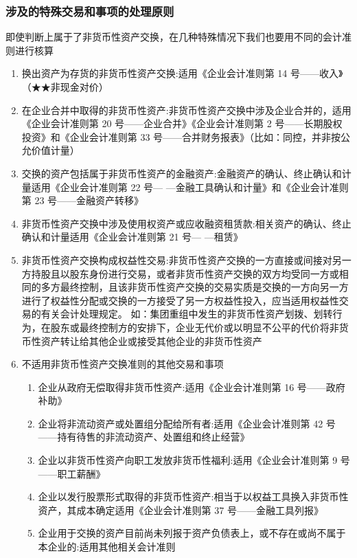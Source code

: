 \documentclass[UTF8,12pt]{ctexart}
\numberwithin{equation}{section} %
\numberwithin{figure}{section}
\numberwithin{table}{section}
\begin{document}
	\subsubsection{涉及的特殊交易和事项的处理原则}
	即使判断上属于了非货币性资产交换，在几种特殊情况下我们也要用不同的会计准则进行核算
	\begin{enumerate}
		\item 换出资产为存货的非货币性资产交换:适用《企业会计准则第 14 号——收入》（★★非现金对价）
		
		\item 在企业合并中取得的非货币性资产:非货币性资产交换中涉及企业合并的，适用《企业会计准则第 20
		号——企业合并》《企业会计准则第 2 号——长期股权投资》和《企业会计准则第 33 号——合并财务报表》（比如：同控，并非按公允价值计量）
		
		\item 交换的资产包括属于非货币性资产的金融资产:金融资产的确认、终止确认和计量适用《企业会计准则第 22 号—
		—金融工具确认和计量》和《企业会计准则第 23 号——金融资产转移》
		
		
		\item 非货币性资产交换中涉及使用权资产或应收融资租赁款:相关资产的确认、终止确认和计量适用《企业会计准则第 21 号—
		—租赁》
		
		
		\item 非货币性资产交换构成权益性交易:非货币性资产交换的一方直接或间接对另一方持股且以股东身份进行交易，或者非货币性资产交换的双方均受同一方或相同的多方最终控制，且该非货币性资产交换的交易实质是交换的一方向另一方进行了权益性分配或交换的一方接受了另一方权益性投入，应当适用权益性交易的有关会计处理规定。
		如：集团重组中发生的非货币性资产划拨、划转行为，在股东或最终控制方的安排下，企业无代价或以明显不公平的代价将非货币性资产转让给其他企业或接受其他企业的非货币性资产
		
		\item 不适用非货币性资产交换准则的其他交易和事项
		\begin{enumerate}
			\item 企业从政府无偿取得非货币性资产:适用《企业会计准则第 16 号——政府补助》
			
			\item 企业将非流动资产或处置组分配给所有者:适用《企业会计准则第 42 号——持有待售的非流动资产、处置组和终止经营》
			
			\item 企业以非货币性资产向职工发放非货币性福利:适用《企业会计准则第 9 号——职工薪酬》
			
			\item 企业以发行股票形式取得的非货币性资产:相当于以权益工具换入非货币性资产，其成本确定适用《企业会计准则第 37 号——金融工具列报》
			
			\item 企业用于交换的资产目前尚未列报于资产负债表上，或不存在或尚不属于本企业的:适用其他相关会计准则
		\end{enumerate}
		
	\end{enumerate}
	
\end{document}
